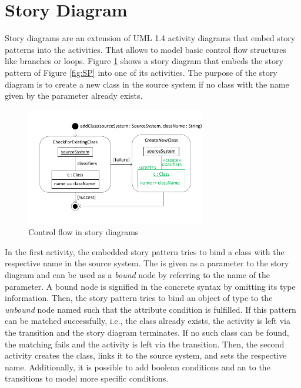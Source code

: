 \section{Story Diagram}

Story diagrams are an extension of UML 1.4 activity diagrams \cite{UML} that embed story patterns into the activities.
That allows to model basic control flow structures like branches or loops.
Figure \ref{fig:controlFlow} shows a story diagram that embeds the story pattern of Figure \ref{fig:SP} into one of its activities.
The purpose of the story diagram is to create a new class in the source system if no class with the name given by the parameter  already exists. 

\begin{figure}[tbp]
\begin{center}
  \includegraphics[width=0.7\textwidth]{figures/ControlFlow}
  \caption{Control flow in story diagrams}
  \label{fig:controlFlow}
\end{center}
\end{figure}

In the first activity, the embedded story pattern tries to bind a class with the respective name in the source system. The  is given as a parameter to the story diagram and can be used as a \emph{bound} node by referring to the name of the parameter. A bound node is signified in the concrete syntax by omitting its type information. Then, the story pattern tries to bind an object of type  to the \emph{unbound} node named  such that the attribute condition is fulfilled. 
If this pattern can be matched successfully, i.e., the class already exists, the activity is left via the \fe{[success]} transition and the story diagram terminates.
If no such class can be found, the matching fails and the activity is left via the \fe{[failure]} transition.
Then, the second activity creates the class, links it to the source system, and sets the respective name. 
Additionally, it is possible to add boolean conditions and an \fe{[else]} to the transitions to model more specific conditions.

